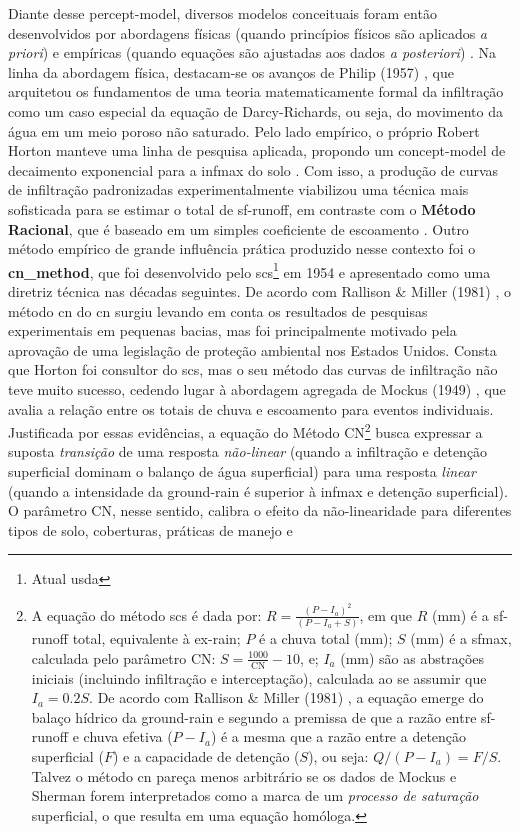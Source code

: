 \documentclass[./main.tex]{subfiles}
\begin{document}
\par Diante desse \gls{percept-model}, diversos modelos conceituais foram então desenvolvidos por abordagens físicas (quando princípios físicos são aplicados \textit{a priori}) e empíricas (quando equações são ajustadas aos dados \textit{a posteriori})  \cite{mishra2003}. Na linha da abordagem física, destacam-se os avanços de Philip (1957) \cite{philip1957}, que arquitetou os fundamentos de uma \gls{teoria} matematicamente formal da infiltração como um caso especial da equação de Darcy-Richards, ou seja, do movimento da água em um meio poroso não saturado. Pelo lado empírico, o próprio Robert Horton manteve uma linha de pesquisa aplicada, propondo um \gls{concept-model} de decaimento exponencial para a \gls{infmax} do solo \cite{Horton1939}. Com isso, a produção de curvas de infiltração padronizadas experimentalmente viabilizou uma técnica mais sofisticada para se estimar o total de \gls{sf-runoff}, em contraste com o \textbf{Método Racional}, que é baseado em um simples coeficiente de escoamento \cite{Cook1946}. Outro método empírico de grande influência prática produzido nesse contexto foi o \textbf{\gls{cn_method}}, que foi desenvolvido pelo \acrfull{scs}\footnote{Atual \acrfull{usda}} em 1954 e apresentado como uma diretriz técnica nas décadas seguintes. De acordo com Rallison \& Miller (1981) \cite{Rallison1981}, o método \acrshort{cn} do \acrshort{cn} surgiu levando em conta os resultados de pesquisas experimentais em pequenas bacias, mas foi principalmente motivado pela aprovação de uma legislação de proteção ambiental nos Estados Unidos. Consta que Horton foi consultor do \acrshort{scs}, mas o seu método das curvas de infiltração não teve muito sucesso, cedendo lugar à abordagem agregada de Mockus (1949) \cite{mockus1949}, que avalia a relação entre os totais de chuva e escoamento para eventos individuais. Justificada por essas evidências, a equação do Método CN\footnote{A equação do método \acrshort{scs} é dada por: $R = \frac{(P - I_a)^{2}}{(P - I_a + S)}$, em que $R$ (mm) é a \gls{sf-runoff} total, equivalente à \gls{ex-rain}; $P$ é a chuva total (mm); $S$ (mm) é a \gls{sfmax}, calculada pelo parâmetro CN: $S = \frac{1000}{\text{CN}}-10$, e; $I_a$ (mm) são as abstrações iniciais (incluindo infiltração e interceptação), calculada ao se assumir que $I_a = 0.2S$. De acordo com Rallison \& Miller (1981) \cite{Rallison1981}, a equação emerge do balaço hídrico da \gls{ground-rain} e segundo a premissa de que a razão entre \gls{sf-runoff} e chuva efetiva ($P - I_a$) é a mesma que a razão entre a detenção superficial ($F$) e a capacidade de detenção ($S$), ou seja: $Q/(P-I_a) = F/S$. Talvez o método \acrshort{cn} pareça menos arbitrário se os dados de Mockus e Sherman forem interpretados como a marca de um \textit{processo de saturação} superficial, o que resulta em uma equação homóloga.} busca expressar a suposta \textit{transição} de uma resposta \textit{não-linear} (quando a infiltração e detenção superficial dominam o balanço de água superficial) para uma resposta \textit{linear} (quando a intensidade da \gls{ground-rain} é superior à \gls{infmax} e detenção superficial). O parâmetro CN, nesse sentido, calibra o efeito da não-linearidade para diferentes tipos de solo, coberturas, práticas de manejo e 
\end{document}
